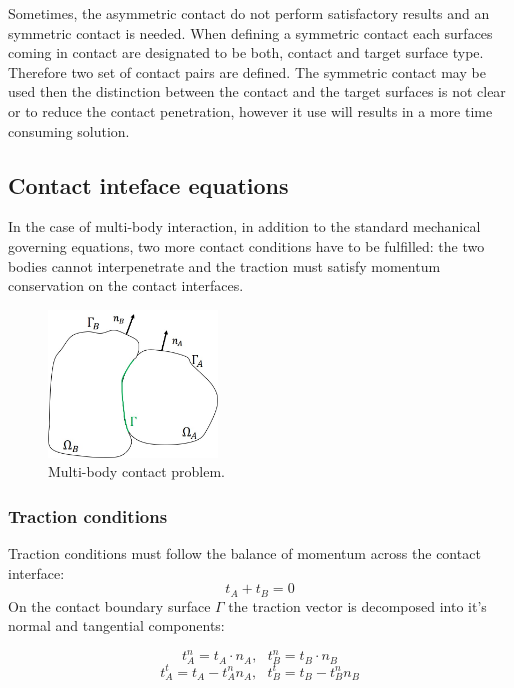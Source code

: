  Sometimes, the asymmetric contact do not perform satisfactory results and an symmetric contact is needed. When defining a symmetric contact each surfaces coming in contact are designated to be both, contact and target surface type. Therefore two set of contact pairs are defined. The symmetric contact may be used then the distinction between the contact and the target surfaces is not clear or to reduce the contact penetration, however it use will results in a more time consuming solution.



\subsection{Contact inteface equations}%
 In the case of multi-body interaction, in addition to the standard mechanical governing equations, two more contact conditions have to be fulfilled: the two bodies cannot interpenetrate and the traction must satisfy momentum conservation on the contact interfaces.
   

 \begin{center}
\begin{figure}
\centerline{\includegraphics[width=0.4\textwidth,keepaspectratio]{figures/contact_bodies.jpg} }
\caption{Multi-body contact problem.}
\label{contact_bodies}
\end{figure}
\end{center} 
   
  \subsubsection*{Traction conditions}
  Traction conditions must follow the balance of momentum across the contact interface:
  \begin{equation}
  t_A + t_B=0
\end{equation}
On the contact boundary surface $\Gamma$ the traction vector is decomposed into it's normal and tangential components:

$$t_A^n = t_A \cdot n_A,  \ \ \ t_B^n = t_B \cdot n_B$$
$$t_A^t = t_A - t_A^n n_A, \ \ \ t_B^t = t_B - t_B^n n_B$$

